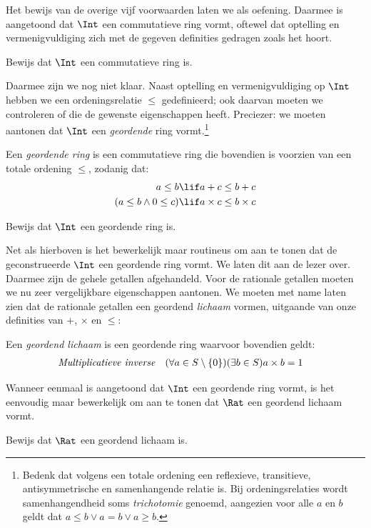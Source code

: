 \documentclass[../../../include/open-logic-section]{subfiles}
\begin{document}
Het bewijs van de overige vijf voorwaarden laten we als oefening.
Daarmee is aangetoond dat $\Int$ een commutatieve ring vormt, oftewel
dat optelling en vermenigvuldiging zich met de gegeven definities
gedragen zoals het hoort.
\begin{prob}
Bewijs dat $\Int$ een commutatieve ring is.
\end{prob}
Daarmee zijn we nog niet klaar. Naast optelling en vermenigvuldiging
op $\Int$ hebben we een ordeningsrelatie $\leq$ gedefinieerd; ook
daarvan moeten we controleren of die de gewenste eigenschappen
heeft. Preciezer: we moeten aantonen dat $\Int$ een \emph{geordende}
ring vormt.\footnote{Bedenk dat volgens
	 een totale ordening
	een reflexieve, transitieve, antisymmetrische en samenhangende relatie is.
	Bij ordeningsrelaties wordt samenhangendheid soms
	\emph{trichotomie} genoemd, aangezien voor alle $a$ en $b$ geldt dat $a \leq b \lor a
	= b \lor a \geq b$.} 
\begin{defn}
Een \emph{geordende ring} is een commutatieve ring die bovendien is
voorzien van een totale ordening $\leq$, zodanig dat:
\begin{align*}
	a \leq b &\lif a + c \leq b + c\\
	(a \leq b \land 0 \leq c) &\lif a \times c \leq b \times c
\end{align*}
\end{defn}
\begin{prob}
Bewijs dat $\Int$ een geordende ring is. 
\end{prob}
Net als hierboven is het bewerkelijk maar routineus om aan te tonen
dat de geconstrueerde $\Int$ een geordende ring vormt. We laten dit
aan de lezer over.
Daarmee zijn de gehele getallen afgehandeld. Voor de rationale
getallen moeten we nu zeer vergelijkbare eigenschappen aantonen. We
moeten met name laten zien dat de rationale getallen een geordend
\emph{lichaam} vormen, uitgaande van onze definities van $+$,
$\times$ en $\leq$:
\begin{defn}
Een \emph{geordend lichaam} is een geordende ring waarvoor bovendien geldt:
\begin{align*}
	\emph{Multiplicatieve inverse}& & (\forall a \in S \setminus \{0\})(\exists b \in S) a\times b& = 1
\end{align*}
\end{defn}
Wanneer eenmaal is aangetoond dat $\Int$ een geordende ring vormt, is
het eenvoudig maar bewerkelijk om aan te tonen dat $\Rat$ een
geordend lichaam vormt.
\begin{prob}
Bewijs dat $\Rat$ een geordend lichaam is.
\end{prob}
\end{document}
